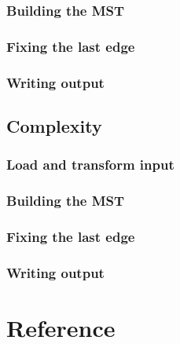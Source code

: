\documentclass{article}
\begin{document}
\subsubsection{Building the MST}

\subsubsection{Fixing the last edge}

\subsubsection{Writing output}

\newpage
\subsection{Complexity}

\subsubsection{Load and transform input}

\subsubsection{Building the MST}
\subsubsection{Fixing the last edge}
\subsubsection{Writing output}

\section{Reference}
\end{document}
